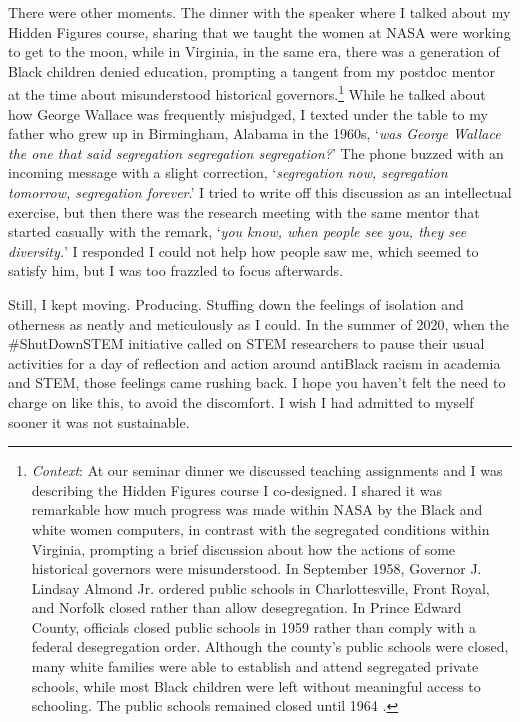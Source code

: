 \documentclass[pdflatex,sn-mathphys-num]{sn-jnl}%
\begin{document}
There were other moments. The dinner with the speaker where I talked about my Hidden Figures course, sharing that we taught the women at NASA were working to get to the moon, while in Virginia, in the same era, there was a generation of Black children denied education, prompting a tangent from my postdoc mentor at the time about misunderstood historical governors.\footnote{\emph{Context}: At our seminar dinner we discussed teaching assignments and I was describing the Hidden Figures course I co-designed. I shared it was remarkable how much progress was made within NASA by the Black and white women computers, in contrast with the segregated conditions within Virginia, prompting a brief discussion about how the actions of some historical governors were misunderstood. In September 1958, Governor J. Lindsay Almond Jr. ordered public schools in Charlottesville, Front Royal, and Norfolk closed rather than allow desegregation. In Prince Edward County, officials closed public schools in 1959 rather than comply with a federal desegregation order. Although the county's public schools were closed, many white families were able to establish and attend segregated private schools, while most Black children were left without meaningful access to schooling. The public schools remained closed until 1964 \cite{bonastia2009white}.} While he talked about how George Wallace was frequently misjudged, I texted under the table to my father who grew up in Birmingham, Alabama in the 1960s, `\emph{was George Wallace the one that said segregation segregation segregation?}' The phone buzzed with an incoming message with a slight correction, `\emph{segregation now, segregation tomorrow, segregation forever}\cite{wallace1963inaugural}.' I tried to write off this discussion as an intellectual exercise, but then there was the research meeting with the same mentor that started casually with the remark, `\emph{you know, when people see you, they see diversity.}' I responded I could not help how people saw me, which seemed to satisfy him, but I was too frazzled to focus afterwards. 

Still, I kept moving. Producing. Stuffing down the feelings of isolation and otherness as neatly and meticulously as I could. In the summer of 2020, when the \#ShutDownSTEM initiative called on STEM researchers to pause their usual activities for a day of reflection and action around antiBlack racism in academia and STEM, those feelings came rushing back. I hope you haven't felt the need to charge on like this, to avoid the discomfort. I wish I had admitted to myself sooner it was not sustainable.
\end{document}
